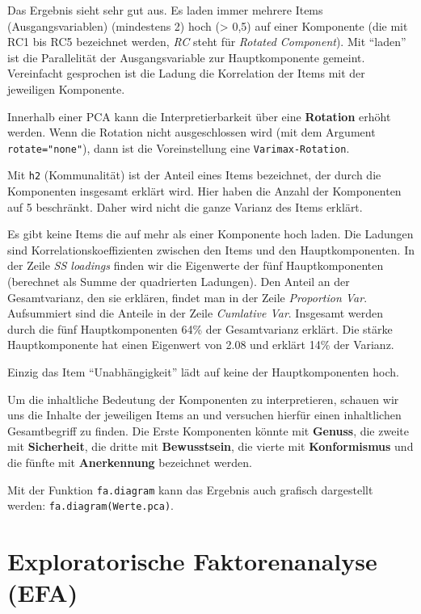 \documentclass[12pt,ngerman,]{book}
\theoremstyle{definition}
\theoremstyle{definition}
\theoremstyle{remark}
\begin{document}
Das Ergebnis sieht sehr gut aus. Es laden immer mehrere Items
(Ausgangsvariablen) (mindestens 2) hoch (\textgreater{} 0,5) auf einer
Komponente (die mit RC1 bis RC5 bezeichnet werden, \emph{RC} steht für
\emph{Rotated Component}). Mit ``laden'' ist die Parallelität der
Ausgangsvariable zur Hauptkomponente gemeint. Vereinfacht gesprochen ist
die Ladung die Korrelation der Items mit der jeweiligen Komponente.

Innerhalb einer PCA kann die Interpretierbarkeit über eine
\textbf{Rotation} erhöht werden. Wenn die Rotation nicht ausgeschlossen
wird (mit dem Argument \texttt{rotate="none"}), dann ist die
Voreinstellung eine \texttt{Varimax-Rotation}.

Mit \texttt{h2} (Kommunalität) ist der Anteil eines Items bezeichnet,
der durch die Komponenten insgesamt erklärt wird. Hier haben die Anzahl
der Komponenten auf 5 beschränkt. Daher wird nicht die ganze Varianz des
Items erklärt.

Es gibt keine Items die auf mehr als einer Komponente hoch laden. Die
Ladungen sind Korrelationskoeffizienten zwischen den Items und den
Hauptkomponenten. In der Zeile \emph{SS loadings} finden wir die
Eigenwerte der fünf Hauptkomponenten (berechnet als Summe der
quadrierten Ladungen). Den Anteil an der Gesamtvarianz, den sie
erklären, findet man in der Zeile \emph{Proportion Var}. Aufsummiert
sind die Anteile in der Zeile \emph{Cumlative Var}. Insgesamt werden
durch die fünf Hauptkomponenten 64\% der Gesamtvarianz erklärt. Die
stärke Hauptkomponente hat einen Eigenwert von 2.08 und erklärt 14\% der
Varianz.

Einzig das Item ``Unabhängigkeit'' lädt auf keine der Hauptkomponenten
hoch.

Um die inhaltliche Bedeutung der Komponenten zu interpretieren, schauen
wir uns die Inhalte der jeweiligen Items an und versuchen hierfür einen
inhaltlichen Gesamtbegriff zu finden. Die Erste Komponenten könnte mit
\textbf{Genuss}, die zweite mit \textbf{Sicherheit}, die dritte mit
\textbf{Bewusstsein}, die vierte mit \textbf{Konformismus} und die
fünfte mit \textbf{Anerkennung} bezeichnet werden.

Mit der Funktion \texttt{fa.diagram} kann das Ergebnis auch grafisch
dargestellt werden: \texttt{fa.diagram(Werte.pca)}.

\section{Exploratorische Faktorenanalyse
(EFA)}\label{exploratorische-faktorenanalyse-efa}
\end{document}
